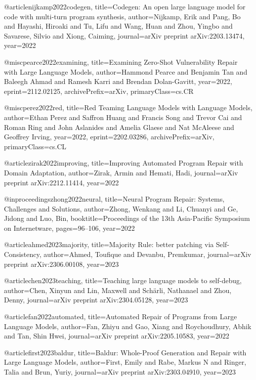 @article{nijkamp2022codegen,
  title={Codegen: An open large language model for code with multi-turn program synthesis},
  author={Nijkamp, Erik and Pang, Bo and Hayashi, Hiroaki and Tu, Lifu and Wang, Huan and Zhou, Yingbo and Savarese, Silvio and Xiong, Caiming},
  journal={arXiv preprint arXiv:2203.13474},
  year={2022}
}

@misc{pearce2022examining,
      title={Examining Zero-Shot Vulnerability Repair with Large Language Models},
      author={Hammond Pearce and Benjamin Tan and Baleegh Ahmad and Ramesh Karri and Brendan Dolan-Gavitt},
      year={2022},
      eprint={2112.02125},
      archivePrefix={arXiv},
      primaryClass={cs.CR}
}

@misc{perez2022red,
      title={Red Teaming Language Models with Language Models},
      author={Ethan Perez and Saffron Huang and Francis Song and Trevor Cai and Roman Ring and John Aslanides and Amelia Glaese and Nat McAleese and Geoffrey Irving},
      year={2022},
      eprint={2202.03286},
      archivePrefix={arXiv},
      primaryClass={cs.CL}
}

@article{zirak2022improving,
  title={Improving Automated Program Repair with Domain Adaptation},
  author={Zirak, Armin and Hemati, Hadi},
  journal={arXiv preprint arXiv:2212.11414},
  year={2022}
}

@inproceedings{zhong2022neural,
  title={Neural Program Repair: Systems, Challenges and Solutions},
  author={Zhong, Wenkang and Li, Chuanyi and Ge, Jidong and Luo, Bin},
  booktitle={Proceedings of the 13th Asia-Pacific Symposium on Internetware},
  pages={96--106},
  year={2022}
}

@article{ahmed2023majority,
  title={Majority Rule: better patching via Self-Consistency},
  author={Ahmed, Toufique and Devanbu, Premkumar},
  journal={arXiv preprint arXiv:2306.00108},
  year={2023}
}


@article{chen2023teaching,
  title={Teaching large language models to self-debug},
  author={Chen, Xinyun and Lin, Maxwell and Sch{\"a}rli, Nathanael and Zhou, Denny},
  journal={arXiv preprint arXiv:2304.05128},
  year={2023}
}

@article{fan2022automated,
  title={Automated Repair of Programs from Large Language Models},
  author={Fan, Zhiyu and Gao, Xiang and Roychoudhury, Abhik and Tan, Shin Hwei},
  journal={arXiv preprint arXiv:2205.10583},
  year={2022}
}

@article{first2023baldur,
  title={Baldur: Whole-Proof Generation and Repair with Large Language Models},
  author={First, Emily and Rabe, Markus N and Ringer, Talia and Brun, Yuriy},
  journal={arXiv preprint arXiv:2303.04910},
  year={2023}
}

